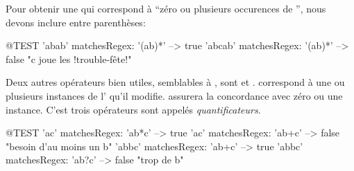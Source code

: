 \documentclass[a4paper,10pt,twoside]{book}
\begin{document}
Pour obtenir une \expreg qui correspond à ``zéro ou plusieurs
occurences de '', nous devons inclure  entre
parenthèses:
\begin{code}{@TEST}
'abab' matchesRegex: '(ab)*'   --> true
'abcab' matchesRegex: '(ab)*' --> false    "c joue les !trouble-fête!"
\end{code} %

Deux autres opérateurs bien utiles, semblables à \ct{*}, sont \ct{+}
et . \ct{+} correspond à une ou plusieurs instances de l'\expreg
qu'il modifie.  assurera la concordance avec zéro ou une
instance.
C'est trois opérateurs sont appelés \emph{quantificateurs}.
\begin{code}{@TEST}
'ac' matchesRegex: 'ab*c'	   --> true
'ac' matchesRegex: 'ab+c'	  --> false    "besoin d'au moins un b"
'abbc' matchesRegex: 'ab+c' --> true
'abbc' matchesRegex: 'ab?c' --> false    "trop de b"
\end{code}
\end{document}

